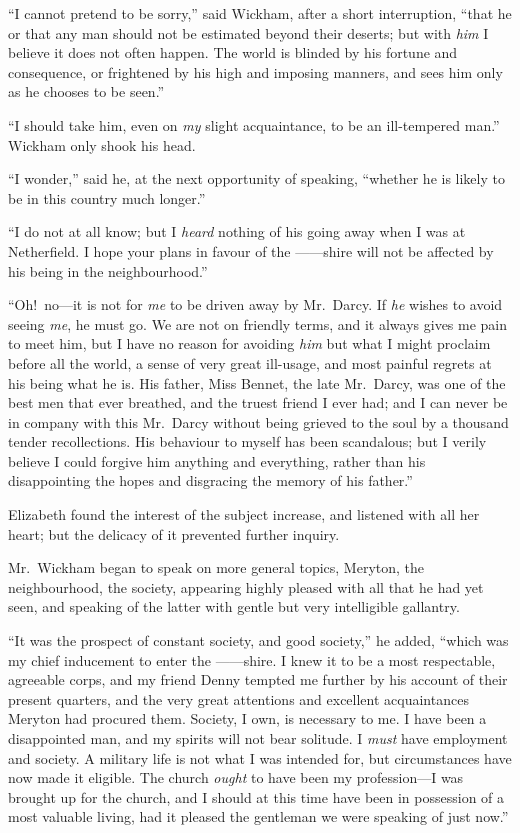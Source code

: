 \documentclass[12pt,english]{book}
\begin{document}
{}``I cannot pretend to be sorry,'' said Wickham, after a short
interruption, {}``that he or that any man should not be estimated
beyond their deserts; but with \textit{him} I believe it does not
often happen. The world is blinded by his fortune and consequence,
or frightened by his high and imposing manners, and sees him only
as he chooses to be seen.''

{}``I should take him, even on \textit{my} slight acquaintance, to
be an ill-tempered man.'' Wickham only shook his head.

{}``I wonder,'' said he, at the next opportunity of speaking, {}``whether
he is likely to be in this country much longer.''

{}``I do not at all know; but I \textit{heard} nothing of his going
away when I was at Netherfield. I hope your plans in favour of the
\mbox{------}shire will not be affected by his being in the neighbourhood.''

{}``Oh!\ no\mbox{---}it is not for \textit{me} to be driven away
by Mr.\ Darcy. If \textit{he} wishes to avoid seeing \textit{me},
he must go. We are not on friendly terms, and it always gives me pain
to meet him, but I have no reason for avoiding \textit{him} but what
I might proclaim before all the world, a sense of very great ill-usage,
and most painful regrets at his being what he is. His father, Miss
Bennet, the late Mr.\ Darcy, was one of the best men that ever breathed,
and the truest friend I ever had; and I can never be in company with
this Mr.\ Darcy without being grieved to the soul by a thousand tender
recollections. His behaviour to myself has been scandalous; but I
verily believe I could forgive him anything and everything, rather
than his disappointing the hopes and disgracing the memory of his
father.''

Elizabeth found the interest of the subject increase, and listened
with all her heart; but the delicacy of it prevented further inquiry.

Mr.\ Wickham began to speak on more general topics, Meryton, the
neighbourhood, the society, appearing highly pleased with all that
he had yet seen, and speaking of the latter with gentle but very intelligible
gallantry.

{}``It was the prospect of constant society, and good society,''
he added, {}``which was my chief inducement to enter the \mbox{------}shire.
I knew it to be a most respectable, agreeable corps, and my friend
Denny tempted me further by his account of their present quarters,
and the very great attentions and excellent acquaintances Meryton
had procured them. Society, I own, is necessary to me. I have been
a disappointed man, and my spirits will not bear solitude. I \textit{must}
have employment and society. A military life is not what I was intended
for, but circumstances have now made it eligible. The church \textit{ought}
to have been my profession\mbox{---}I was brought up for the church,
and I should at this time have been in possession of a most valuable
living, had it pleased the gentleman we were speaking of just now.''
\end{document}
